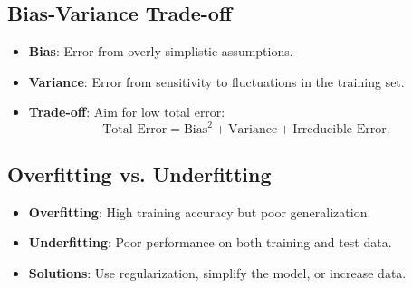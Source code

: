 \documentclass[10pt,a4paper]{article}
\begin{document}



\subsection*{Bias-Variance Trade-off}
\begin{itemize}
    \item \textbf{Bias}: Error from overly simplistic assumptions.
    \item \textbf{Variance}: Error from sensitivity to fluctuations in the training set.
    \item \textbf{Trade-off}: Aim for low total error:
    \[
    \text{Total Error} = \text{Bias}^2 + \text{Variance} + \text{Irreducible Error}.
    \]
\end{itemize}



\subsection*{Overfitting vs. Underfitting}
\begin{itemize}
    \item \textbf{Overfitting}: High training accuracy but poor generalization.
    \item \textbf{Underfitting}: Poor performance on both training and test data.
    \item \textbf{Solutions}: Use regularization, simplify the model, or increase data.
\end{itemize}
\end{document}
